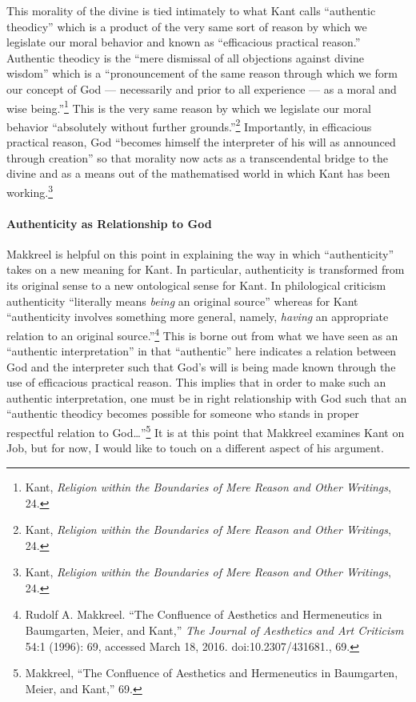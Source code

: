 \documentclass[12pt]{article}
\begin{document}
	This morality of the divine is tied intimately to what Kant calls ``authentic theodicy'' which is a product of the very same sort of reason by which we legislate our moral behavior and known as ``efficacious practical reason.'' Authentic theodicy is the ``mere dismissal of all objections against divine wisdom'' which is a ``pronouncement of the same reason through which we form our concept of God --- necessarily and prior to all experience --- as a moral and wise being.''\footnote{Kant, \emph{Religion within the Boundaries of Mere Reason and Other Writings}, 24.} This is the very same reason by which we legislate our moral behavior ``absolutely without further grounds.''\footnote{Kant, \emph{Religion within the Boundaries of Mere Reason and Other Writings}, 24.} Importantly, in efficacious practical reason, God ``becomes himself the interpreter of his will as announced through creation'' so that morality now acts as a transcendental bridge to the divine and as a means out of the mathematised world in which Kant has been working.\footnote{Kant, \emph{Religion within the Boundaries of Mere Reason and Other Writings}, 24.}  
	
	\paragraph*{Authenticity as Relationship to God} Makkreel is helpful on this point in explaining the way in which ``authenticity'' takes on a new meaning for Kant. In particular, authenticity is transformed from its original sense to a new ontological sense for Kant. In philological criticism authenticity ``literally means \emph{being} an original source'' whereas for Kant ``authenticity involves something more general, namely, \emph{having} an appropriate relation to an original source.''\footnote{Rudolf A. Makkreel. ``The Confluence of Aesthetics and Hermeneutics in Baumgarten, Meier, and Kant,'' \emph{The Journal of Aesthetics and Art Criticism} 54:1 (1996): 69, accessed March 18, 2016. doi:10.2307/431681., 69.} This is borne out from what we have seen as an ``authentic interpretation'' in that ``authentic'' here indicates a relation between God and the interpreter such that God's will is being made known through the use of efficacious practical reason. This implies that in order to make such an authentic interpretation, one must be in right relationship with God such that an ``authentic theodicy becomes possible for someone who stands in proper respectful relation to God\ldots''\footnote{Makkreel, ``The Confluence of Aesthetics and Hermeneutics in Baumgarten, Meier, and Kant,'' 69.} It is at this point that Makkreel examines Kant on Job, but for now, I would like to touch on a different aspect of his argument.
	
\end{document}
